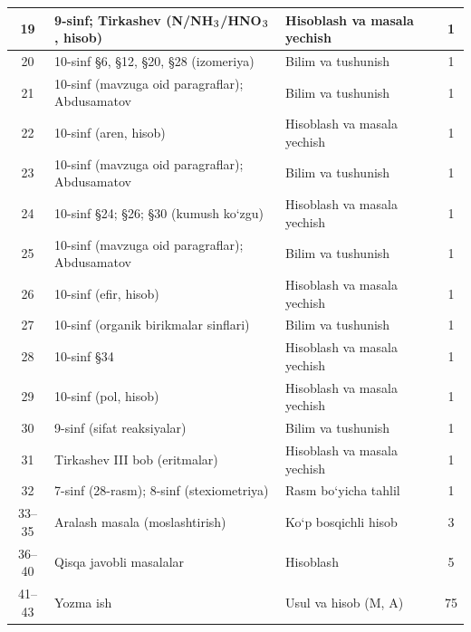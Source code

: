 \documentclass[11pt,a4paper]{article}
\renewcommand{\textsubscript}[1]{\ensuremath{_{\text{\fontsize{8}{8}\selectfont #1}}}}
\begin{document}
{\begin{longtable}{|c|p{7.2cm}|p{5.4cm}|c|}
19 & 9-sinf; Tirkashev (N/NH\textsubscript{3}/HNO\textsubscript{3}, hisob) & Hisoblash va masala yechish & 1\\\hline
20 & 10-sinf \S{}6, \S{}12, \S{}20, \S{}28 (izomeriya) & Bilim va tushunish & 1\\\hline
21 & 10-sinf (mavzuga oid paragraflar); Abdusamatov & Bilim va tushunish & 1\\\hline
22 & 10-sinf (aren, hisob) & Hisoblash va masala yechish & 1\\\hline
23 & 10-sinf (mavzuga oid paragraflar); Abdusamatov & Bilim va tushunish & 1\\\hline
24 & 10-sinf \S{}24; \S{}26; \S{}30 (kumush ko`zgu) & Hisoblash va masala yechish & 1\\\hline
25 & 10-sinf (mavzuga oid paragraflar); Abdusamatov & Bilim va tushunish & 1\\\hline
26 & 10-sinf (efir, hisob) & Hisoblash va masala yechish & 1\\\hline
27 & 10-sinf (organik birikmalar sinflari) & Bilim va tushunish & 1\\\hline
28 & 10-sinf \S{}34 & Hisoblash va masala yechish & 1\\\hline
29 & 10-sinf (pol, hisob) & Hisoblash va masala yechish & 1\\\hline
30 & 9-sinf (sifat reaksiyalar) & Bilim va tushunish & 1\\\hline
31 & Tirkashev III bob (eritmalar) & Hisoblash va masala yechish & 1\\\hline
32 & 7-sinf (28-rasm); 8-sinf (stexiometriya) & Rasm bo`yicha tahlil & 1\\\hline
33--35 & Aralash masala (moslashtirish) & Ko`p bosqichli hisob & 3\\\hline
36--40 & Qisqa javobli masalalar & Hisoblash & 5\\\hline
41--43 & Yozma ish & Usul va hisob (M, A) & 75\\\hline
\end{longtable}}
\end{document}
